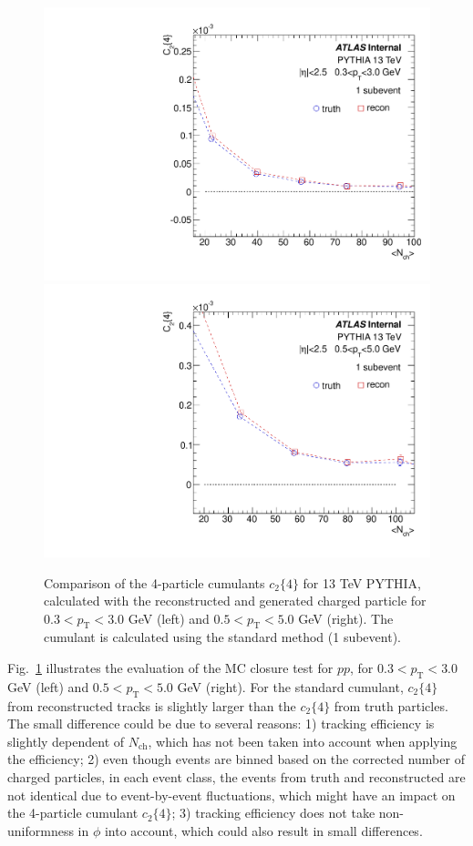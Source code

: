 \begin{figure}[H]
\centering
\includegraphics[width=0.45\linewidth]{figs/sec_sys/pp13/MC_closure_1sub_pt0.pdf}
\includegraphics[width=0.45\linewidth]{figs/sec_sys/pp13/MC_closure_1sub_pt1.pdf}
\caption{Comparison of the 4-particle cumulants $c_{2}\{4\}$ for 13 TeV PYTHIA, calculated with the reconstructed and generated charged particle for $0.3<p_{\text{T}}<3.0$ GeV (left) and $0.5<p_{\text{T}}<5.0$ GeV (right). The cumulant is calculated using the standard method (1 subevent).}
\label{fig:MC_closure_1sub}
\end{figure}

Fig.~\ref{fig:MC_closure_1sub} illustrates the evaluation of the MC closure test for $pp$, for $0.3<p_{\text{T}}<3.0$ GeV (left) and $0.5<p_{\text{T}}<5.0$ GeV (right). For the standard cumulant, $c_{2}\{4\}$ from reconstructed tracks is slightly larger than the $c_{2}\{4\}$ from truth particles. The small difference could be due to several reasons: 1) tracking efficiency is slightly dependent of $N_{\text{ch}}$, which has not been taken into account when applying the efficiency; 2) even though events are binned based on the corrected number of charged particles, in each event class, the events from truth and reconstructed are not identical due to event-by-event fluctuations, which might have an impact on the 4-particle cumulant $c_{2}\{4\}$; 3) tracking efficiency does not take non-uniformness in $\phi$ into account, which could also result in small differences.

